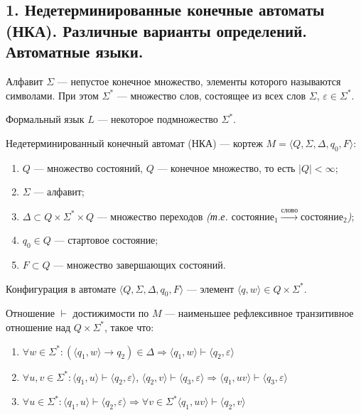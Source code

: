 \subsection{1. Недетерминированные конечные автоматы (НКА). Различные варианты определений. Автоматные языки.}

\Def Алфавит $\Sigma$ — непустое конечное множество, элементы которого называются символами. При этом $\Sigma^*$ — множество слов, состоящее из всех слов $\Sigma$, $\varepsilon \in \Sigma^*$.

\Def Формальный язык $L$ — некоторое подмножество $\Sigma^*$.

\Def Недетерминированный конечный автомат (НКА) — кортеж $M = \langle Q, \Sigma, \Delta, q_0, F \rangle$:

\begin{enumerate}
    \item $Q$ — множество состояний, $Q$ — конечное множество, то есть $|Q| < \infty$;
    \item $\Sigma$ — алфавит;
    \item $\Delta \subset Q \times \Sigma^* \times Q$ — множество переходов \textit{(т.е. $\text{состояние}_{1} \xrightarrow{\text{слово}} \text{состояние}_{2}$)};
    \item $q_0 \in Q$ — стартовое состояние;
    \item $F \subset Q$ — множество завершающих состояний.
\end{enumerate}

\Def Конфигурация в автомате $\langle Q, \Sigma, \Delta, q_0, F \rangle$ — элемент $\langle q, w \rangle \in Q \times \Sigma^*$.

\Def Отношение $\vdash$ достижимости по $M$ — наименьшее рефлексивное транзитивное отношение над $Q \times \Sigma^*$, такое что:

\begin{enumerate}
    \item $\forall w \in \Sigma^* : (\langle q_1, w \rangle \rightarrow q_2) \in \Delta \Longrightarrow \langle q_1, w \rangle \vdash \langle q_2, \varepsilon \rangle$
    \item $\forall u, v \in \Sigma^* : \langle q_1, u \rangle \vdash \langle q_2, \varepsilon \rangle$, $\langle q_2, v \rangle \vdash \langle q_3, \varepsilon \rangle \Longrightarrow \langle q_1, uv \rangle \vdash \langle q_3, \varepsilon \rangle$
    \item $\forall u \in \Sigma^* : \langle q_1, u \rangle \vdash \langle q_2, \varepsilon \rangle \Longrightarrow \forall v \in \Sigma^* \langle q_1, uv \rangle \vdash \langle q_2, v \rangle$
\end{enumerate}

